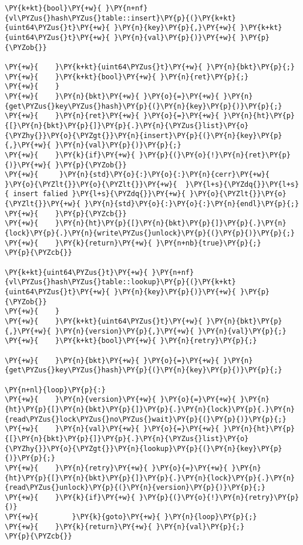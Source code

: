 \begin{Verbatim}[commandchars=\\\{\},codes={\catcode`\$=3\catcode`\^=7\catcode`\_=8\relax}]
\PY{k+kt}{bool}\PY{+w}{ }\PY{n+nf}{vl\PYZus{}hash\PYZus{}table::insert}\PY{p}{(}\PY{k+kt}{uint64\PYZus{}t}\PY{+w}{ }\PY{n}{key}\PY{p}{,}\PY{+w}{ }\PY{k+kt}{uint64\PYZus{}t}\PY{+w}{ }\PY{n}{val}\PY{p}{)}\PY{+w}{ }\PY{p}{\PYZob{}}

\PY{+w}{    }\PY{k+kt}{uint64\PYZus{}t}\PY{+w}{ }\PY{n}{bkt}\PY{p}{;}
\PY{+w}{    }\PY{k+kt}{bool}\PY{+w}{ }\PY{n}{ret}\PY{p}{;}
\PY{+w}{    }
\PY{+w}{    }\PY{n}{bkt}\PY{+w}{ }\PY{o}{=}\PY{+w}{ }\PY{n}{get\PYZus{}key\PYZus{}hash}\PY{p}{(}\PY{n}{key}\PY{p}{)}\PY{p}{;}
\PY{+w}{    }\PY{n}{ret}\PY{+w}{ }\PY{o}{=}\PY{+w}{ }\PY{n}{ht}\PY{p}{[}\PY{n}{bkt}\PY{p}{]}\PY{p}{.}\PY{n}{\PYZus{}list}\PY{o}{\PYZhy{}}\PY{o}{\PYZgt{}}\PY{n}{insert}\PY{p}{(}\PY{n}{key}\PY{p}{,}\PY{+w}{ }\PY{n}{val}\PY{p}{)}\PY{p}{;}
\PY{+w}{    }\PY{k}{if}\PY{+w}{ }\PY{p}{(}\PY{o}{!}\PY{n}{ret}\PY{p}{)}\PY{+w}{ }\PY{p}{\PYZob{}}
\PY{+w}{     }\PY{n}{std}\PY{o}{:}\PY{o}{:}\PY{n}{cerr}\PY{+w}{ }\PY{o}{\PYZlt{}}\PY{o}{\PYZlt{}}\PY{+w}{  }\PY{l+s}{\PYZdq{}}\PY{l+s}{ insert falied }\PY{l+s}{\PYZdq{}}\PY{+w}{ }\PY{o}{\PYZlt{}}\PY{o}{\PYZlt{}}\PY{+w}{ }\PY{n}{std}\PY{o}{:}\PY{o}{:}\PY{n}{endl}\PY{p}{;}
\PY{+w}{    }\PY{p}{\PYZcb{}}
\PY{+w}{    }\PY{n}{ht}\PY{p}{[}\PY{n}{bkt}\PY{p}{]}\PY{p}{.}\PY{n}{lock}\PY{p}{.}\PY{n}{write\PYZus{}unlock}\PY{p}{(}\PY{p}{)}\PY{p}{;}
\PY{+w}{    }\PY{k}{return}\PY{+w}{ }\PY{n+nb}{true}\PY{p}{;}
\PY{p}{\PYZcb{}}

\PY{k+kt}{uint64\PYZus{}t}\PY{+w}{ }\PY{n+nf}{vl\PYZus{}hash\PYZus{}table::lookup}\PY{p}{(}\PY{k+kt}{uint64\PYZus{}t}\PY{+w}{ }\PY{n}{key}\PY{p}{)}\PY{+w}{ }\PY{p}{\PYZob{}}
\PY{+w}{    }
\PY{+w}{    }\PY{k+kt}{uint64\PYZus{}t}\PY{+w}{ }\PY{n}{bkt}\PY{p}{,}\PY{+w}{ }\PY{n}{version}\PY{p}{,}\PY{+w}{ }\PY{n}{val}\PY{p}{;}
\PY{+w}{    }\PY{k+kt}{bool}\PY{+w}{ }\PY{n}{retry}\PY{p}{;}

\PY{+w}{    }\PY{n}{bkt}\PY{+w}{ }\PY{o}{=}\PY{+w}{ }\PY{n}{get\PYZus{}key\PYZus{}hash}\PY{p}{(}\PY{n}{key}\PY{p}{)}\PY{p}{;}

\PY{n+nl}{loop}\PY{p}{:}
\PY{+w}{    }\PY{n}{version}\PY{+w}{ }\PY{o}{=}\PY{+w}{ }\PY{n}{ht}\PY{p}{[}\PY{n}{bkt}\PY{p}{]}\PY{p}{.}\PY{n}{lock}\PY{p}{.}\PY{n}{read\PYZus{}lock\PYZus{}no\PYZus{}wait}\PY{p}{(}\PY{p}{)}\PY{p}{;}
\PY{+w}{    }\PY{n}{val}\PY{+w}{ }\PY{o}{=}\PY{+w}{ }\PY{n}{ht}\PY{p}{[}\PY{n}{bkt}\PY{p}{]}\PY{p}{.}\PY{n}{\PYZus{}list}\PY{o}{\PYZhy{}}\PY{o}{\PYZgt{}}\PY{n}{lookup}\PY{p}{(}\PY{n}{key}\PY{p}{)}\PY{p}{;}
\PY{+w}{    }\PY{n}{retry}\PY{+w}{ }\PY{o}{=}\PY{+w}{ }\PY{n}{ht}\PY{p}{[}\PY{n}{bkt}\PY{p}{]}\PY{p}{.}\PY{n}{lock}\PY{p}{.}\PY{n}{read\PYZus{}unlock}\PY{p}{(}\PY{n}{version}\PY{p}{)}\PY{p}{;}
\PY{+w}{    }\PY{k}{if}\PY{+w}{ }\PY{p}{(}\PY{o}{!}\PY{n}{retry}\PY{p}{)}
\PY{+w}{        }\PY{k}{goto}\PY{+w}{ }\PY{n}{loop}\PY{p}{;}
\PY{+w}{    }\PY{k}{return}\PY{+w}{ }\PY{n}{val}\PY{p}{;}
\PY{p}{\PYZcb{}}
\end{Verbatim}
